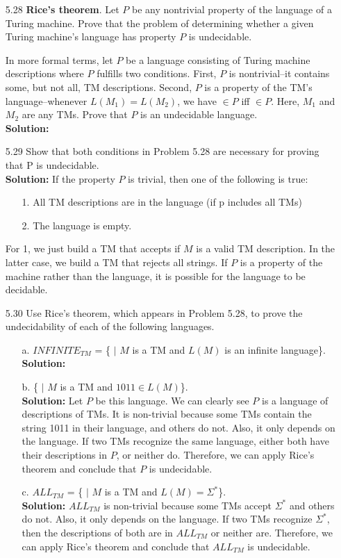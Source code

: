 \begin{enumerate}
\item[5.28]\textbf{Rice's theorem}. Let $P$ be any nontrivial property of the language of a Turing machine. Prove that the problem of determining whether a given Turing machine's language has property $P$ is undecidable.

\par In more formal terms, let $P$ be a language consisting of Turing machine descriptions where $P$ fulfills two conditions. First, $P$ is nontrivial--it contains some, but not all, TM descriptions. Second, $P$ is a property of the TM's language--whenever $L(M_1) = L(M_2)$, we have  $\in P$ iff  $\in P$. Here, $M_1$ and $M_2$ are any TMs. Prove that $P$ is an undecidable language.
\\
\textbf{Solution:} \alreadyanswered

\item[5.29]Show that both conditions in Problem 5.28 are necessary for proving that P is undecidable.
\\
\textbf{Solution:} If the property $P$ is trivial, then one of the following is true:
\begin{enumerate}
\item[1.]All TM descriptions are in the language (if p includes all TMs)
\item[2.]The language is empty. 
\end{enumerate}
For 1, we just build a TM that accepts if $M$ is a valid TM description. In the latter case, we build a TM that rejects all strings. If $P$ is a property of the machine rather than the language, it is possible for the language to be decidable.

\item[5.30]Use Rice's theorem, which appears in Problem 5.28, to prove the undecidability of each of the following languages.
\begin{enumerate}
\item[a.]$INFINITE_{TM}$ = \{ $|$ $M$ is a TM and $L(M)$ is an infinite language\}.
\\
\textbf{Solution:} \alreadyanswered
\item[b.]\{ $|$ $M$ is a TM and $1011 \in L(M)$\}.
\\
\textbf{Solution:} Let $P$ be this language. We can clearly see $P$ is a language of descriptions of TMs. It is non-trivial because some TMs contain the string 1011 in their language, and others do not. Also, it only depends on the language. If two TMs recognize the same language, either both have their descriptions in $P$, or neither do. Therefore, we can apply Rice's theorem and conclude that $P$ is undecidable.
\item[c.]$ALL_{TM}$ = \{ $|$ $M$ is a TM and $L(M) = \Sigma^*$\}.
\\
\textbf{Solution:} $ALL_{TM}$ is non-trivial because some TMs accept $\Sigma^*$ and others do not. Also, it only depends on the language. If two TMs recognize $\Sigma^*$, then the descriptions of both are in $ALL_{TM}$ or neither are. Therefore, we can apply Rice's theorem and conclude that $ALL_{TM}$ is undecidable.
\end{enumerate}

\end{enumerate}
